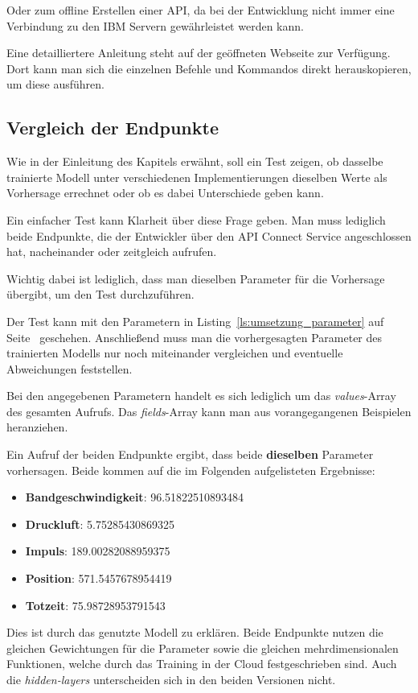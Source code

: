 Oder zum offline Erstellen einer API, da bei der Entwicklung nicht immer eine Verbindung zu den IBM Servern
gewährleistet werden kann.

Eine detailliertere Anleitung steht auf der geöffneten Webseite zur Verfügung. Dort kann man sich die einzelnen Befehle
und Kommandos direkt herauskopieren, um diese ausführen.

\subsection{Vergleich der Endpunkte}
Wie in der Einleitung des Kapitels erwähnt, soll ein Test zeigen, ob dasselbe trainierte Modell unter verschiedenen
Implementierungen dieselben Werte als Vorhersage errechnet oder ob es dabei Unterschiede geben kann.

Ein einfacher Test kann Klarheit über diese Frage geben. Man muss lediglich beide Endpunkte, die der Entwickler über
den API Connect Service angeschlossen hat, nacheinander oder zeitgleich aufrufen.

Wichtig dabei ist lediglich, dass man dieselben Parameter für die Vorhersage übergibt, um den Test durchzuführen.

Der Test kann mit den Parametern in Listing~\ref{ls:umsetzung_parameter} auf Seite~\pageref{ls:umsetzung_parameter} 
geschehen. Anschließend muss man die vorhergesagten Parameter des trainierten Modells nur noch miteinander vergleichen
und eventuelle Abweichungen feststellen.

Bei den angegebenen Parametern handelt es sich lediglich um das \textit{values}-Array des gesamten Aufrufs. Das 
\textit{fields}-Array kann man aus vorangegangenen Beispielen heranziehen.

Ein Aufruf der beiden Endpunkte ergibt, dass beide \textbf{dieselben} Parameter vorhersagen. Beide kommen auf die
im Folgenden aufgelisteten Ergebnisse:

\begin{itemize}
    \item \textbf{Bandgeschwindigkeit}: 96.51822510893484
    \item \textbf{Druckluft}: 5.75285430869325
    \item \textbf{Impuls}: 189.00282088959375
    \item \textbf{Position}: 571.5457678954419
    \item \textbf{Totzeit}: 75.98728953791543
\end{itemize}

Dies ist durch das genutzte Modell zu erklären. Beide Endpunkte nutzen die gleichen Gewichtungen für die Parameter sowie
die gleichen mehrdimensionalen Funktionen, welche durch das Training in der Cloud festgeschrieben sind. Auch die
\textit{hidden-layers} unterscheiden sich in den beiden Versionen nicht.

